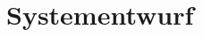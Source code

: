 \chapter{Systementwurf}\label{chp:systementwurf}


\section{}
\paragraph{}


\section{}
\paragraph{}
